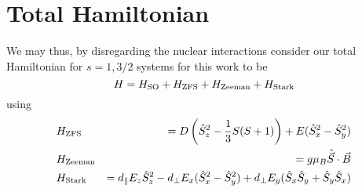 \section{Total Hamiltonian}
We may thus, by disregarding the nuclear interactions consider our total Hamiltonian for $s=1, 3/2$ systems for this work to be 
\begin{equation}
    H = H_{\ce{SO}} + H_{\ce{ZFS}} + H_{\ce{Zeeman}} + H_{\ce{Stark}}
    \label{eq:total_hamiltonian}
\end{equation}
using 
\begin{eqnarray}
    &H_{\ce{ZFS}} &=  D\left(\hat{S}_z^2 - \frac{1}{3}S(S+1)\right)  + E(\hat{S}_x^2 - \hat{S}_y^2)\label{H_ZFS}\\ 
    &H_{\ce{Zeeman}} &= g \mu_B \hat{\vec{S}}\cdot \vec{B} \label{H_Zeeman}\\ 
    &H_{\ce{Stark}} &= d_\parallel E_z \hat{S}_z^2 - d_\perp E_x (\hat{S}_x^2 - \hat{S}_y^2) + d_\perp E_y (\hat{S}_x\hat{S}_y + \hat{S}_y \hat{S}_x) \label{H_Stark}
\end{eqnarray}


